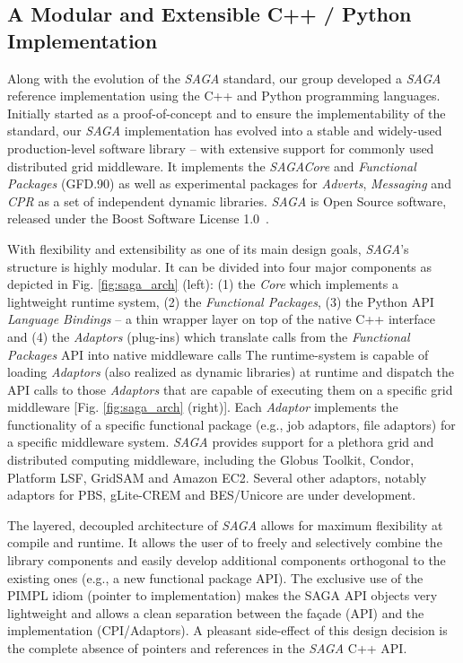 \documentclass[a4paper,10pt]{article}
\newcommand{\I}[1]{\textit{#1}}
\newcommand{\sagaspec}{\textit{SAGA}\xspace}
\newcommand{\sagaimpl}{\textit{SAGA}\xspace}
\newcommand{\spec}{\sagaspec}
\newcommand{\impl}{\sagaimpl}
\begin{document}
\vspace{-0.8em}


\subsection*{A Modular and Extensible C++ / Python Implementation}
\vspace{-0.5em}

Along with the evolution of the \spec standard, our group developed a \impl reference implementation using the C++ and Python programming languages. Initially started as a proof-of-concept and to ensure the implementability of the standard, our \impl implementation has evolved into a stable and widely-used production-level software library -- with extensive support for commonly used distributed grid middleware. It implements the \spec \textit{Core} and \textit{Functional Packages} (GFD.90) as well as experimental packages for \textit{Adverts}, \textit{Messaging} and \textit{CPR} as a set of independent dynamic libraries. \impl is Open Source software, released under the Boost Software License 1.0~\cite{boost_license_web}. 

With flexibility and extensibility as one of its main design goals, \impl's structure is highly modular. It can be divided into four major components as depicted in Fig. \ref{fig:saga_arch} (left): (1) the \I{Core} which implements a lightweight runtime system, (2) the \I{Functional Packages}, (3) the Python API \I{Language Bindings} -- a thin wrapper layer on top of the native C++ interface and (4) the \I{Adaptors} (plug-ins) which translate calls from the \I{Functional Packages} API into native middleware calls The runtime-system is capable of loading \I{Adaptors} (also realized as dynamic libraries) at runtime and dispatch the API calls to those \I{Adaptors} that are capable of executing them on a specific grid middleware [Fig. \ref{fig:saga_arch} (right)]. Each \I{Adaptor} implements the functionality of a specific functional package (e.g., job adaptors, file adaptors) for a specific middleware system. \impl provides support for a plethora grid and distributed computing middleware, including the Globus Toolkit, Condor, Platform LSF, GridSAM and Amazon EC2. Several other adaptors, notably adaptors for PBS, gLite-CREM and BES/Unicore are under development. 

The layered, decoupled architecture of \impl allows for maximum flexibility at compile and runtime. It allows the user of to freely and selectively combine the library components and easily develop additional components orthogonal to the existing ones (e.g., a new functional package API). The exclusive use of the PIMPL idiom (pointer to implementation) makes the SAGA API objects very lightweight and allows a clean separation between the fa\c{c}ade (API) and the implementation (CPI/Adaptors). A pleasant side-effect of this design decision is the complete absence of pointers and references in the \impl C++ API.
\end{document}

